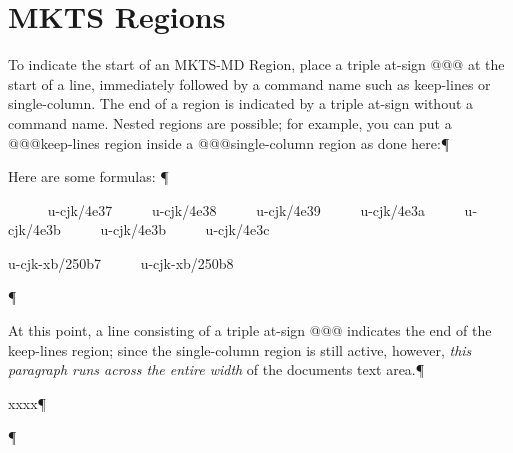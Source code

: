 \section{MKTS Regions 
}
To indicate the start of an MKTS-MD Region, place a triple at-sign {\mktsFontfileSourcecodeproregular{}@@@}
at the start of a line, immediately followed by a command name such as
{\mktsFontfileSourcecodeproregular{}keep-lines} or {\mktsFontfileSourcecodeproregular{}single-column}. The end of a region is indicated by a
triple at-sign without a command name. Nested regions are possible; for example,
\null\newpage{}you can put a {\mktsFontfileSourcecodeproregular{}@@@keep-lines} region inside a {\mktsFontfileSourcecodeproregular{}@@@single-column} region as
done here:¶\par
{}Here are some formulas:
¶\par
\begingroup{}     
{\mktsFontfileSourcecodeproregular{}u-cjk/4e37}     
{\mktsFontfileSourcecodeproregular{}u-cjk/4e38}     
{\mktsFontfileSourcecodeproregular{}u-cjk/4e39}     
{\mktsFontfileSourcecodeproregular{}u-cjk/4e3a}     
{\mktsFontfileSourcecodeproregular{}u-cjk/4e3b}     
{\mktsFontfileSourcecodeproregular{}u-cjk/4e3b}     
{\mktsFontfileSourcecodeproregular{}u-cjk/4e3c}     

{\mktsFontfileSourcecodeproregular{}u-cjk-xb/250b7}     
{\mktsFontfileSourcecodeproregular{}u-cjk-xb/250b8}     

\endgroup{}¶\par
At this point, a line consisting of a triple at-sign {\mktsFontfileSourcecodeproregular{}@@@}
indicates the end of the {\mktsFontfileSourcecodeproregular{}keep-lines} region; since the
{\mktsFontfileSourcecodeproregular{}single-column} region is still active, however, \textit{this
paragraph runs across the entire width} of the documents text
area.¶\par
xxxx¶\par
{}¶\par

